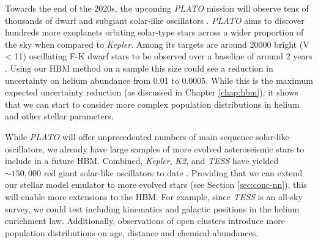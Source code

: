 
Towards the end of the 2020s, the upcoming \emph{PLATO} mission will observe tens of thousands of dwarf and subgiant solar-like oscillators \citep{Rauer.Catala.ea2014}. \emph{PLATO} aims to discover hundreds more exoplanets orbiting solar-type stars across a wider proportion of the sky when compared to \emph{Kepler}. Among its targets are around \num{20000} bright (V < 11) oscillating F-K dwarf stars to be observed over a baseline of around 2 years \citep{Goupil2017}. Using our HBM method on a sample this size could see a reduction in uncertainty on helium abundance from 0.01 to 0.0005. While this is the maximum expected uncertainty reduction (as discussed in Chapter \ref{chap:hbm}), it shows that we can start to consider more complex population distributions in helium and other stellar parameters.

While \emph{PLATO} will offer unprecedented numbers of main sequence solar-like oscillators, we already have large samples of more evolved asteroseismic stars to include in a future HBM. Combined, \emph{Kepler}, \emph{K2}, and \emph{TESS} have yielded \(\sim 150,000\) red giant solar-like oscillators to date \citep{Hon.Huber.ea2021,Yu.Huber.ea2018}. Providing that we can extend our stellar model emulator to more evolved stars (see Section \ref{sec:conc-nn}), this will enable more extensions to the HBM. For example, since \emph{TESS} is an all-sky survey, we could test including kinematics and galactic positions in the helium enrichment law. Additionally, observations of open clusters introduce more population distributions on age, distance and chemical abundances.


